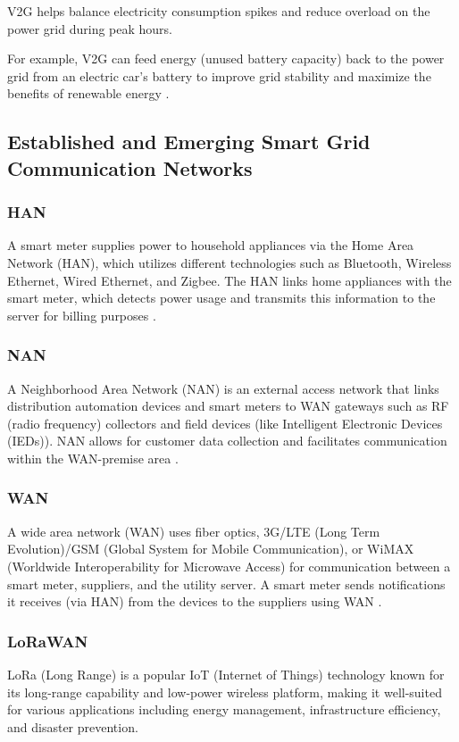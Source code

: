  

V2G helps balance electricity consumption spikes and reduce overload on the power grid during peak hours.

 

For example, V2G can feed energy (unused battery capacity) back to the power grid from an electric car’s battery to improve grid stability and maximize the benefits of renewable energy \cite{WhatIsSmartgrid}.

 \subsection{Established and Emerging Smart Grid Communication Networks}
 \subsubsection{HAN}
 A smart meter supplies power to household appliances via the Home Area Network (HAN), which utilizes different technologies such as Bluetooth, Wireless Ethernet, Wired Ethernet, and Zigbee. The HAN links home appliances with the smart meter, which detects power usage and transmits this information to the server for billing purposes \cite{WhatIsSmartgrid}.
 \subsubsection{NAN}
 A Neighborhood Area Network (NAN) is an external access network that links distribution automation devices and smart meters to WAN gateways such as RF (radio frequency) collectors and field devices (like Intelligent Electronic Devices (IEDs)). NAN allows for customer data collection and facilitates communication within the WAN-premise area \cite{WhatIsSmartgrid}.
 \subsubsection{WAN}
 A wide area network (WAN) uses fiber optics, 3G/LTE (Long Term Evolution)/GSM (Global System for Mobile Communication), or WiMAX (Worldwide Interoperability for Microwave Access) for communication between a smart meter, suppliers, and the utility server. A smart meter sends notifications it receives (via HAN) from the devices to the suppliers using WAN \cite{WhatIsSmartgrid}. 
 \subsubsection{LoRaWAN}
 LoRa (Long Range) is a popular IoT (Internet of Things) technology known for its long-range capability and low-power wireless platform, making it well-suited for various applications including energy management, infrastructure efficiency, and disaster prevention.

